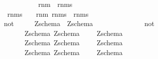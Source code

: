 \begin{isabellebody}
\ \ {\isachardoublequoteopen}{\isachardoublequoteclose}\ \ \ \ \ \ \ \ {\isacharcolon}{\isacharcolon}\ {\isachardoublequoteopen}rnm\ {\isacharequal}{\isachargreater}\ rnms{\isachardoublequoteclose}\ \ \ \ \ \ \ \ \ \ \ \ \ \ \ \ \ \ \ \ \ \ {\isacharparenleft}{\isachardoublequoteopen}{\isacharunderscore}{\isachardoublequoteclose}{\isacharparenright}\isanewline
\ \ {\isachardoublequoteopen}{\isacharunderscore}rnms{\isachardoublequoteclose}\ \ \ {\isacharcolon}{\isacharcolon}\ {\isachardoublequoteopen}{\isacharbrackleft}rnm{\isacharcomma}\ rnms{\isacharbrackright}\ {\isacharequal}{\isachargreater}\ rnms{\isachardoublequoteclose}\ \ \ \ \ \ \ \ \ \ \ \ \ \ {\isacharparenleft}{\isachardoublequoteopen}{\isacharunderscore}{\isacharcomma}{\isacharslash}\ {\isacharunderscore}{\isachardoublequoteclose}{\isacharparenright}\ \ \isanewline
\ {\isachardoublequoteopen}{\isacharpercent}not{\isachardoublequoteclose}\ \ \ \ \ {\isacharcolon}{\isacharcolon}\ {\isachardoublequoteopen}Zschema\ {\isacharequal}{\isachargreater}\ Zschema{\isachardoublequoteclose}\ \ \ \ \ \ \ \ \ \ \ \ \ \ \ {\isacharparenleft}{\isachardoublequoteopen}{\isacharpercent}not\ {\isacharparenleft}{\isacharunderscore}{\isacharparenright}{\isacharslash}{\isacharslash}{\isachardoublequoteclose}\ {\isacharbrackleft}{}{}{\isacharbrackright}{}{}{\isacharparenright}\ \ \ \ \ \ \isanewline
\ \ {\isachardoublequoteopen}{\isacharbackslash}{\isacharprime}{\isacharslash}{\isachardoublequoteclose}\ \ \ \ {\isacharcolon}{\isacharcolon}\ {\isachardoublequoteopen}{\isacharbrackleft}Zschema{\isacharcomma}\ Zschema{\isacharbrackright}\ \ \ \ {\isacharequal}{\isachargreater}\ Zschema{\isachardoublequoteclose}\ {\isacharparenleft}\ {}{}{\isacharparenright}\ \isanewline
\ \ {\isachardoublequoteopen}{\isacharprime}{\isacharslash}{\isacharbackslash}{\isachardoublequoteclose}\ \ \ \ {\isacharcolon}{\isacharcolon}\ {\isachardoublequoteopen}{\isacharbrackleft}Zschema{\isacharcomma}\ Zschema{\isacharbrackright}\ \ \ \ {\isacharequal}{\isachargreater}\ Zschema{\isachardoublequoteclose}\ {\isacharparenleft}\ {}{}{\isacharparenright}\ \isanewline
\ \ {\isachardoublequoteopen}{\isacharequal}{\isacharplus}{\isacharequal}{\isachargreater}{\isachardoublequoteclose}\ \ \ \ {\isacharcolon}{\isacharcolon}\ {\isachardoublequoteopen}{\isacharbrackleft}Zschema{\isacharcomma}\ Zschema{\isacharbrackright}\ \ \ \ {\isacharequal}{\isachargreater}\ Zschema{\isachardoublequoteclose}\ {\isacharparenleft}\ {}{}{\isacharparenright}\ \isanewline

\end{isabellebody}
